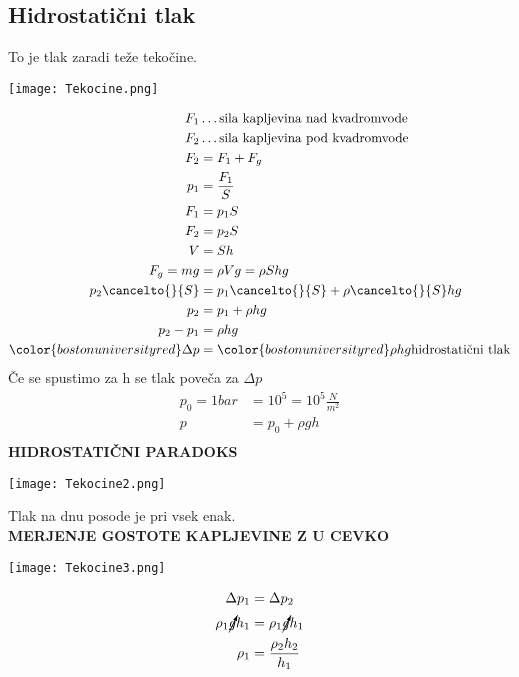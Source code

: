 {\color{indiagreen}\subsection{Hidrostatični tlak}}
To je tlak zaradi teže tekočine.\\
\begin{center}
	\texttt{[image: Tekocine.png]}
\end{center}
\begin{align*}
	F_1 &\dots \text{sila kapljevina nad kvadromvode}\\
 	F_2 &\dots \text{sila kapljevina pod kvadromvode}\\
 	F_2 &= F_1 + F_g\\
 	p_1 &= \frac{F_1}{S}\\
 	F_1 &= p_1S\\
 	F_2 &= p_2S\\
 	V &= Sh\\
 	F_g = mg &= \rho V g = \rho Shg\\
 	p_2 \cancelto{}{S} &= p_1\cancelto{}{S} + \rho \cancelto{}{S}hg\\
 	p_2 &= p_1 + \rho hg\\
 	p_2-p_1 &= \rho hg\\
 	{\color{bostonuniversityred}\Delta p} &= {\color{bostonuniversityred}\rho hg} \text{hidrostatični tlak}\\
\end{align*}
Če se spustimo za h se tlak poveča za $\Delta p$\\
\begin{align*}
	p_0 = 1bar &= 10^5 = 10^5 \frac{N}{m^2}\\
	p &= p_0 + \rho gh\\
\end{align*}
\textbf{HIDROSTATIČNI PARADOKS}
\begin{center}
	\texttt{[image: Tekocine2.png]}
\end{center}
Tlak na dnu posode je pri vsek enak.\\
\textbf{MERJENJE GOSTOTE KAPLJEVINE Z U CEVKO}
\begin{center}
	\texttt{[image: Tekocine3.png]}
\end{center}
\begin{align*}
	\Delta p_1 &= \Delta p_2\\
	\rho_1 \cancelto{}{g} h_1 &= \rho_1 \cancelto{}{g} h_1\\
	\rho_1 &= \frac{\rho_2 h_2}{h_1}
\end{align*}
